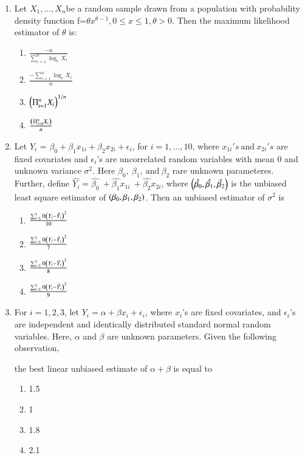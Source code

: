 \documentclass[journal]{IEEEtran}
\begin{document}
\begin{enumerate}
\item Let $X_{1}, ..., X_{n}$be a random sample drawn from a population with probability density function f=$\theta x^{\theta-1}, 0\leq x\leq1,\theta>0$. Then the maximum likelihood estimator of $\theta$ is:
\begin{multicols}{4}
\begin{enumerate}
    \item $\frac{-n}{\sum_{i=1}^n \log_e {X_i}}$
    \item $\frac{-\sum_{i=1}^n \log_e {X_i}}{n}$
    \item $\left(\Pi_{i=1}^n X_i\right)^{1/n}$
    \item $\frac{\left(\Pi_{i=0}^n X_i\right)}{n}$
\end{enumerate}
\end{multicols}

\item Let $Y_i$ = $\beta_0+\beta_1x_{1i}+\beta_2x_{2i}+\epsilon_i$, for $i=1, ... ,10$, where $x_{1i}'s \ \text{and}\ x_{2i}'s$ are fixed covariates and $\epsilon_i$'s are uncorrelated random variables with mean 0 and unknown variance $\sigma^{2}$. Here $\beta_0,\ \beta_1,\ \text{and}\ \beta_2$ rare unknown parameteres. Further, define $\hat{Y_i} = \hat{\beta_0}  \ +\hat{\beta_1}x_{1i} \  +\hat{\beta_2}x_{2i}$, where $\left(\hat{\beta_0},\hat{\beta_1},\hat{\beta_2}\right)$ is the unbiased least square estimator of $\left(\beta_0,\beta_1,\beta_2\right)$. Then an unbiased estimator of $\sigma^2$ is
\begin{multicols}{4}
\begin{enumerate}
    \item $\frac{\sum_{i=1}^10 \left(Y_i-\hat{Y_i}\right)^2}{10}$
    \item $\frac{\sum_{i=1}^10 \left(Y_i-\hat{Y_i}\right)^2}{7}$
    \item $\frac{\sum_{i=1}^10 \left(Y_i-\hat{Y_i}\right)^2}{8}$
    \item $\frac{\sum_{i=1}^10 \left(Y_i-\hat{Y_i}\right)^2}{9}$
\end{enumerate}
\end{multicols}

\item For $i = 1, 2, 3$, let $Y_{i} = \alpha + \beta x_{i} + \epsilon_{i}$, where $x_{i}$'s are fixed covariates, and $\epsilon_{i}$'s are independent and identically distributed standard normal random variables. Here, $\alpha$ and $\beta$ are unknown parameters. Given the following observation,
\\
\begin{table}[h]
    \centering
    
    \label{tab:my_label}
\end{table}
the best linear unbiased estimate of $\alpha+\beta$ is equal to
\begin{multicols}{4}
\begin{enumerate}
    \item 1.5
    \item 1
    \item 1.8
    \item 2.1
\end{enumerate}
\end{multicols}


\end{enumerate}
\end{document}
